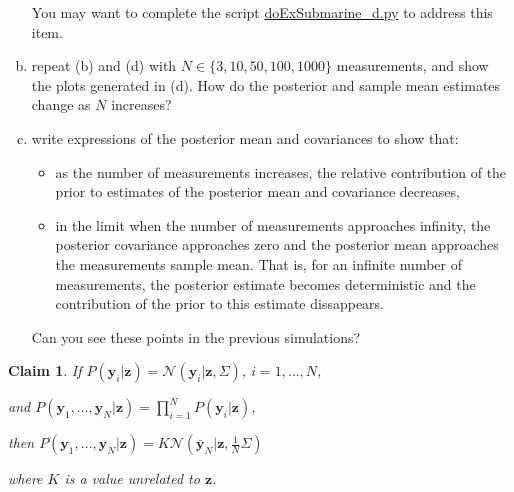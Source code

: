 \documentclass[12pt]{article}
\newtheorem{claim}{Claim}
\begin{document}
\begin{enumerate}[(a)]
        You may want to complete the script
        \href{https://github.com/joacorapela/gcnuBridging2023/blob/master/code/scripts/probability/multivariateGaussians/inferenceInTheLinearGaussianModel/doExSubmarine_d.py}{doExSubmarine\_d.py}
        to address this item.

    \item repeat (b) and (d) with $N\in\{3,10,50,100,1000\}$ measurements, and show
        the plots generated in (d).  How do the posterior and sample mean
        estimates change as $N$ increases?

    \item write expressions of the posterior mean and covariances to show that:

        \begin{itemize}

            \item as the number of measurements increases, the relative
                contribution of the prior to estimates of the posterior
                mean and covariance decreases,

            \item in the limit when the number of measurements approaches
                infinity, the posterior covariance approaches zero and the
                posterior mean approaches the measurements sample mean.
                That is, for an infinite number of measurements, the
                posterior estimate becomes deterministic and the
                contribution of the prior to this estimate dissappears.

        \end{itemize}

        Can you see these points in the previous simulations?

\end{enumerate}

\pagebreak

\begin{claim}
    If
    $P(\mathbf{y}_i|\mathbf{z})=\mathcal{N}\left(\mathbf{y}_i|\mathbf{z},\Sigma\right)$,
    $i=1,\ldots,N$, 

    and
    $P(\mathbf{y}_1,\ldots,\mathbf{y}_N|\mathbf{z})=\prod_{i=1}^N
    P(\mathbf{y}_i|\mathbf{z})$, 

    then
    $P(\mathbf{y}_1,\ldots,\mathbf{y}_N|\mathbf{z})=K\mathcal{N}(\bar{\mathbf{y}}_N|\mathbf{z},\frac{1}{N}\Sigma)$

    where $K$ is a value unrelated to $\mathbf{z}$.
    \label{claim:likelihoodForZ}
\end{claim}
\end{document}
